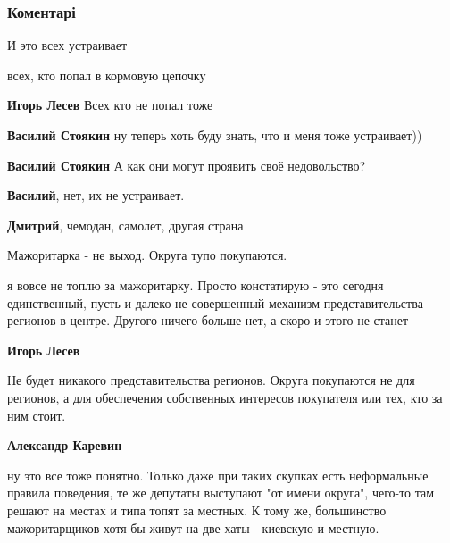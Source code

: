  
 
 
 
 
\subsubsection{Коментарі}
\label{sec:04_06_2020.fb.lesev_igor.1.unitarizm_ukraina.cmt}

\begin{itemize} %
И это всех устраивает

\begin{itemize} %
всех, кто попал в кормовую цепочку

\textbf{Игорь Лесев} Всех кто не попал тоже

\textbf{Василий Стоякин} ну теперь хоть буду знать, что и меня тоже устраивает))

\textbf{Василий Стоякин} А как они могут проявить своё недовольство?

\textbf{Василий}, нет, их не устраивает.

\textbf{Дмитрий}, чемодан, самолет, другая страна
\end{itemize} %

Мажоритарка - не выход. Округа тупо покупаются.

\begin{itemize} %

я вовсе не топлю за мажоритарку. Просто констатирую - это сегодня единственный,
пусть и далеко не совершенный механизм представительства регионов в центре.
Другого ничего больше нет, а скоро и этого не станет

\textbf{Игорь Лесев} 

Не будет никакого представительства регионов. Округа покупаются не для
регионов, а для обеспечения собственных интересов покупателя или тех, кто за
ним стоит.

\textbf{Александр Каревин} 

ну это все тоже понятно. Только даже при таких скупках есть неформальные
правила поведения, те же депутаты выступают "от имени округа", чего-то там
решают на местах и типа топят за местных. К тому же, большинство мажоритарщиков
хотя бы живут на две хаты - киевскую и местную.


\end{itemize}
\end{itemize}
